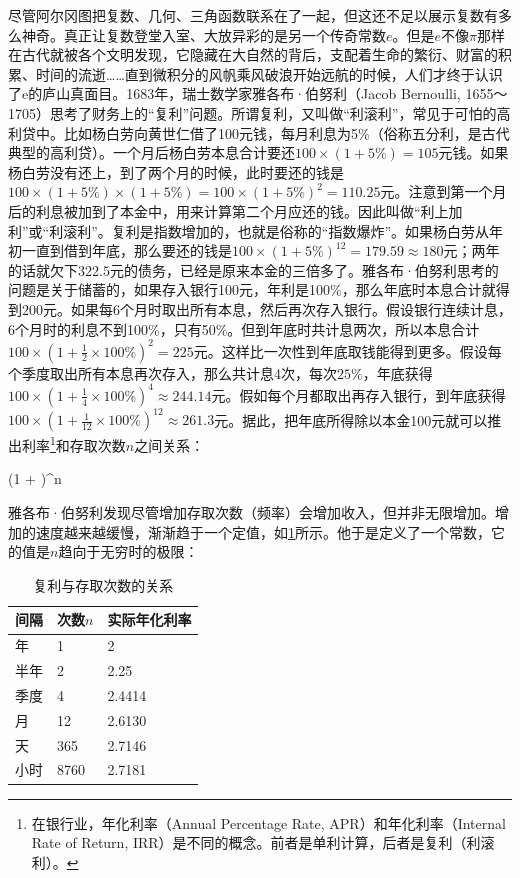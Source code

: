 \documentclass[b5paper]{ctexart}
\begin{document}
尽管阿尔冈图把复数、几何、三角函数联系在了一起，但这还不足以展示复数有多么神奇。真正让复数登堂入室、大放异彩的是另一个传奇常数$e$。但是$e$不像$\pi$那样在古代就被各个文明发现，它隐藏在大自然的背后，支配着生命的繁衍、财富的积累、时间的流逝……直到微积分的风帆乘风破浪开始远航的时候，人们才终于认识了e的庐山真面目。1683年，瑞士数学家雅各布·伯努利（Jacob Bernoulli, 1655～1705）思考了财务上的“复利”问题。所谓复利，又叫做“利滚利”，常见于可怕的高利贷中。比如杨白劳向黄世仁借了100元钱，每月利息为5\%（俗称五分利，是古代典型的高利贷）。一个月后杨白劳本息合计要还$100 \times (1 + 5\%) = 105$元钱。如果杨白劳没有还上，到了两个月的时候，此时要还的钱是$100 \times (1 + 5\%) \times (1 + 5\%) = 100 \times (1 + 5\%)^2 = 110.25$元。注意到第一个月后的利息被加到了本金中，用来计算第二个月应还的钱。因此叫做“利上加利”或“利滚利”。复利是指数增加的，也就是俗称的“指数爆炸”。如果杨白劳从年初一直到借到年底，那么要还的钱是$100 \times (1 + 5\%)^{12} = 179.59 \approx 180$元；两年的话就欠下$322.5$元的债务，已经是原来本金的三倍多了。雅各布·伯努利思考的问题是关于储蓄的，如果存入银行100元，年利是100\%，那么年底时本息合计就得到$200$元。如果每6个月时取出所有本息，然后再次存入银行。假设银行连续计息，6个月时的利息不到100\%，只有50\%。但到年底时共计息两次，所以本息合计$100 \times (1 + \frac{1}{2}\times 100\%)^2 = 225$元。这样比一次性到年底取钱能得到更多。假设每个季度取出所有本息再次存入，那么共计息4次，每次$25\%$，年底获得$100 \times (1 + \frac{1}{4} \times 100\%)^4 \approx 244.14$元。假如每个月都取出再存入银行，到年底获得$100 \times (1 + \frac{1}{12} \times 100\%)^{12} \approx 261.3$元。据此，把年底所得除以本金100元就可以推出利率\footnote{在银行业，年化利率（Annual Percentage Rate, APR）和年化利率（Internal Rate of Return, IRR）是不同的概念。前者是单利计算，后者是复利（利滚利）。}和存取次数$n$之间关系：

\be
(1 + )^n
\ee

雅各布·伯努利发现尽管增加存取次数（频率）会增加收入，但并非无限增加。增加的速度越来越缓慢，渐渐趋于一个定值，如\cref{tab:compound-interest}所示。他于是定义了一个常数，它的值是$n$趋向于无穷时的极限：

\begin{table}[ht]
  \caption{复利与存取次数的关系}
  \centering
  \begin{tabular}{|l|l|l|}
    \hline
    间隔 & 次数$n$ & 实际年化利率 \\
    \hline
    年 & 1 & 2 \\
    半年 & 2 & 2.25 \\
    季度 & 4 & 2.4414 \\
    月 & 12 & 2.6130 \\
    天 & 365 & 2.7146 \\
    小时 & 8760 & 2.7181 \\
    \hline
  \end{tabular}
  \label{tab:compound-interest}
\end{table}
\end{document}
